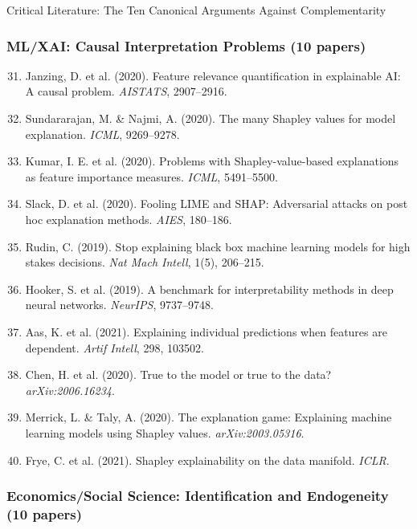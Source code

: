 \begin{chapter}{Critical Literature: The Ten Canonical Arguments Against Complementarity}
\subsubsection{ML/XAI: Causal Interpretation Problems (10 papers)}

\begin{enumerate}
    \setcounter{enumi}{30}
    \item Janzing, D. et al. (2020). Feature relevance quantification in explainable AI: A causal problem. \textit{AISTATS}, 2907--2916.

    \item Sundararajan, M. \& Najmi, A. (2020). The many Shapley values for model explanation. \textit{ICML}, 9269--9278.

    \item Kumar, I. E. et al. (2020). Problems with Shapley-value-based explanations as feature importance measures. \textit{ICML}, 5491--5500.

    \item Slack, D. et al. (2020). Fooling LIME and SHAP: Adversarial attacks on post hoc explanation methods. \textit{AIES}, 180--186.

    \item Rudin, C. (2019). Stop explaining black box machine learning models for high stakes decisions. \textit{Nat Mach Intell}, 1(5), 206--215.

    \item Hooker, S. et al. (2019). A benchmark for interpretability methods in deep neural networks. \textit{NeurIPS}, 9737--9748.

    \item Aas, K. et al. (2021). Explaining individual predictions when features are dependent. \textit{Artif Intell}, 298, 103502.

    \item Chen, H. et al. (2020). True to the model or true to the data? \textit{arXiv:2006.16234}.

    \item Merrick, L. \& Taly, A. (2020). The explanation game: Explaining machine learning models using Shapley values. \textit{arXiv:2003.05316}.

    \item Frye, C. et al. (2021). Shapley explainability on the data manifold. \textit{ICLR}.
\end{enumerate}

\subsubsection{Economics/Social Science: Identification and Endogeneity (10 papers)}


\end{chapter}
